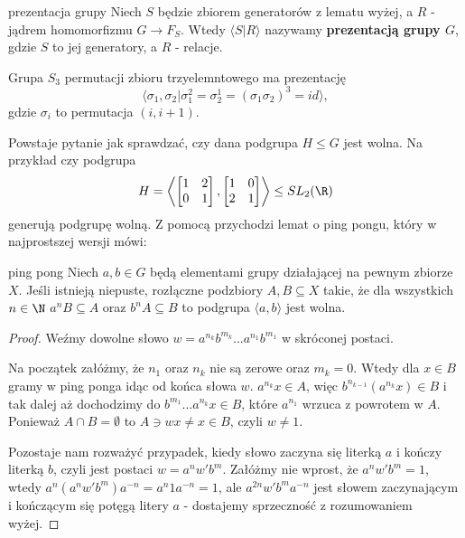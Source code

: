 \begin{definition}{prezentacja grupy}{}
  Niech $S$ będzie zbiorem generatorów z lematu wyżej, a $R$ - jądrem homomorfizmu $G\to F_S$. Wtedy $\langle S|R\rangle$ nazywamy \textbf{prezentacją grupy $G$}, gdzie $S$ to jej generatory, a $R$ - relacje.
\end{definition}

\begin{example}
Grupa $S_3$ permutacji zbioru trzyelemntowego ma prezentację 
$$\langle \sigma_1, \sigma_2|\sigma_1^2=\sigma_2^1=(\sigma_1\sigma_2)^3=id\rangle,$$ 
gdzie $\sigma_i$ to permutacja $(i, i+1)$.
\end{example}

Powstaje pytanie jak sprawdzać, czy dana podgrupa $H\leq G$ jest wolna. Na przykład czy podgrupa
$$H=\left\langle\begin{bmatrix}1&2\\0&1\end{bmatrix},\begin{bmatrix}1&0\\2&1\end{bmatrix}\right\rangle\leq SL_2(\R)$$ 
generują podgrupę wolną. Z pomocą przychodzi lemat o ping pongu, który w najprostszej wersji mówi:

\begin{lemma}{ping pong}{}
  Niech $a, b\in G$ będą elementami grupy działającej na pewnym zbiorze $X$. Jeśli istnieją niepuste, rozłączne podzbiory $A,B\subseteq X$ takie, że dla wszystkich $n\in \N$ $a^nB\subseteq A$ oraz $b^nA\subseteq B$ to podgrupa $\langle a,b\rangle$ jest wolna.
\end{lemma}

\begin{proof}
  Weźmy dowolne słowo $w=a^{n_k}b^{m_k}...a^{n_1}b^{m_1}$ w skróconej postaci. 

  Na początek załóżmy, że $n_1$ oraz $n_k$ nie są zerowe oraz $m_k=0$. Wtedy dla $x\in B$ gramy w ping ponga idąc od końca słowa $w$. $a^{n_k}x\in A$, więc $b^{n_{k-1}}(a^{n_k}x)\in B$ i tak dalej aż dochodzimy do $b^{m_1}...a^{n_k}x\in B$, które $a^{n_1}$ wrzuca z powrotem w $A$. Ponieważ $A\cap B=\emptyset$ to $A\ni wx\neq x\in B$, czyli $w\neq 1$. 

  Pozostaje nam rozważyć przypadek, kiedy słowo zaczyna się literką $a$ i kończy literką $b$, czyli jest postaci $w=a^n w'b^m$. Załóżmy nie wprost, że $a^nw'b^m=1$, wtedy $a^n(a^nw'b^m)a^{-n}=a^n1a^{-n}=1$, ale $a^{2n}w'b^ma^{-n}$ jest słowem zaczynającym i kończącym się potęgą litery $a$ - dostajemy sprzeczność z rozumowaniem wyżej.
\end{proof}

